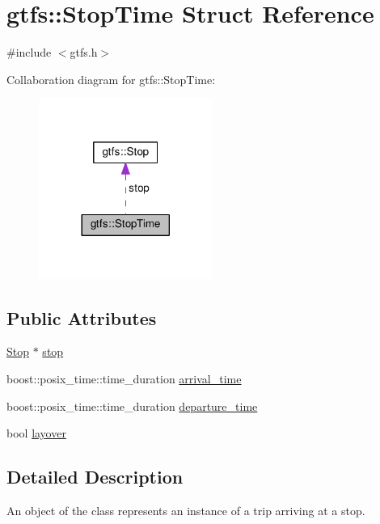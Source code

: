\hypertarget{structgtfs_1_1StopTime}{}\section{gtfs\+:\+:Stop\+Time Struct Reference}
\label{structgtfs_1_1StopTime}


{\ttfamily \#include $<$gtfs.\+h$>$}



Collaboration diagram for gtfs\+:\+:Stop\+Time\+:
\nopagebreak
\begin{figure}[H]
\begin{center}
\leavevmode
\includegraphics[width=161pt]{structgtfs_1_1StopTime__coll__graph}
\end{center}
\end{figure}
\subsection*{Public Attributes}
\begin{DoxyCompactItemize}
\item 
\hyperlink{classgtfs_1_1Stop}{Stop} $\ast$ \hyperlink{structgtfs_1_1StopTime_a258bc40f919b9d804797d7d75f0c0eca}{stop}
\item 
boost\+::posix\+\_\+time\+::time\+\_\+duration \hyperlink{structgtfs_1_1StopTime_a994ec898edd96675200f759acd76a57c}{arrival\+\_\+time}
\item 
boost\+::posix\+\_\+time\+::time\+\_\+duration \hyperlink{structgtfs_1_1StopTime_ad11c398eca36ff99f0934883141de3c9}{departure\+\_\+time}
\item 
bool \hyperlink{structgtfs_1_1StopTime_af8cc780329a837a49a5d6af60b74b9bf}{layover}
\end{DoxyCompactItemize}


\subsection{Detailed Description}
An object of the class represents an instance of a trip arriving at a stop.

